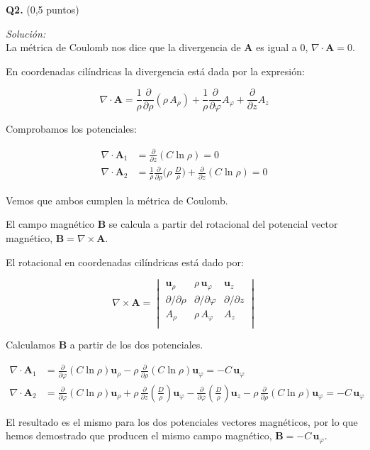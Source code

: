 \textbf{Q2.} (0,5 puntos)


\vspace{20px}
\textit{Solución:}
\\

La métrica de Coulomb nos dice que la divergencia de $\textbf{A}$ es igual a 0, $\nabla \cdot \textbf{A} = 0$.

En coordenadas cilíndricas la divergencia está dada por la expresión:

\begin{equation*}
    \nabla \cdot \textbf{A} = \frac{1}{\rho} \frac{\partial}{\partial \rho} ( \rho \, A_\rho )
    + \frac{1}{\rho} \frac{\partial}{\partial \varphi} A_{\varphi}
    + \frac{\partial}{\partial z} A_z
\end{equation*}

Comprobamos los potenciales:

\begin{align*}
    \nabla \cdot \textbf{A}_1 & = \frac{\partial}{\partial z} ( C \ln\rho) = 0 \\[6px]
    \nabla \cdot \textbf{A}_2 & = \frac{1}{\rho} \frac{\partial}{\partial \rho} \biggl( \rho \; \frac{D}{\rho} \biggr)
    + \frac{\partial}{\partial z} ( C \ln\rho) = 0
\end{align*}

Vemos que ambos cumplen la métrica de Coulomb.

El campo magnético $\textbf{B}$ se calcula a partir del rotacional del potencial vector magnético, $ \textbf{B} = \nabla \times \textbf{A}$.

El rotacional en coordenadas cilíndricas está dado por:

\begin{equation*}
    \nabla \times \textbf{A} =
    \begin{vmatrix}
        \textbf{u}_\rho         & \rho \, \textbf{u}_\varphi & \textbf{u}_z          \\[6px]
        \partial / \partial\rho & \partial / \partial\varphi & \partial / \partial z  \\[6px]
        A_\rho                  & \rho \, A_\varphi          & A_z                    \\[6px]
    \end{vmatrix}
\end{equation*}

Calculamos $\textbf{B}$ a partir de los dos potenciales.

\begin{align*}
    \nabla \cdot \textbf{A}_1 & = \frac{\partial}{\partial \varphi} ( C \ln\rho) \textbf{u}_\rho -
    \rho \, \frac{\partial}{\partial \rho} ( C \ln\rho) \textbf{u}_\varphi  = - C \, \textbf{u}_\varphi  \\
    \nabla \cdot \textbf{A}_2 & = \frac{\partial}{\partial \varphi} ( C \ln\rho) \textbf{u}_\rho +
    \rho \, \frac{\partial}{\partial z} ( \frac{D}{\rho}) \textbf{u}_\varphi  -
    \frac{\partial}{\partial \varphi} (  \frac{D}{\rho}) \textbf{u}_z -
    \rho \, \frac{\partial}{\partial \rho} ( C \ln\rho) \textbf{u}_\varphi  = - C \, \textbf{u}_\varphi
\end{align*}

El resultado es el mismo para los dos potenciales vectores magnéticos, por lo que hemos demostrado que producen el mismo campo magnético,
$\textbf{B} = - C \, \textbf{u}_\varphi$.
